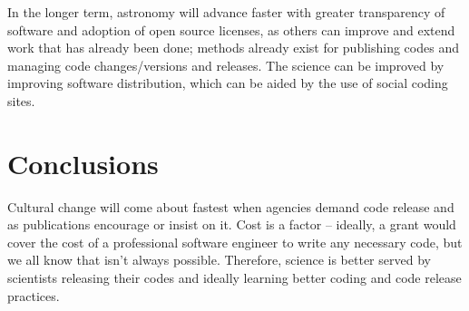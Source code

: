 In the longer term, astronomy will advance faster with greater transparency of software and adoption of open source licenses, as others can improve and extend work that has already been done; methods already exist for publishing codes and managing code changes/versions and releases. The science can be improved by improving software distribution, which can be aided by the use of social coding sites.

\section{Conclusions}

Cultural change will come about fastest when agencies demand code release and as publications encourage or insist on it. Cost is a factor -- ideally, a grant would cover the cost of a professional software engineer to write any necessary code, but we all know that isn't always possible. Therefore, science is better served by scientists releasing their codes and ideally learning better coding and code release practices.




